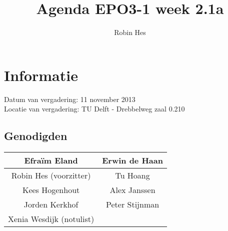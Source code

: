 \documentclass{article}
\begin{document}
\title{Agenda EPO3-1 week 2.1a}%
\author{Robin Hes}%
\maketitle

\section*{Informatie}
Datum van vergadering: 11 november 2013\\ %
Locatie van vergadering: TU Delft - Drebbelweg zaal 0.210 %
\subsection*{Genodigden}
\begin{center}
\begin{tabular}{|c |c |}
	\hline
	Efraïm Eland & Erwin de Haan \\
	\hline
	Robin Hes (voorzitter) & Tu Hoang \\
	\hline
	Kees Hogenhout & Alex Janssen \\
	\hline
	Jorden Kerkhof & Peter Stijnman \\
	\hline
	Xenia Wesdijk (notulist) & \\
	\hline
\end{tabular}
\end{center}
\end{document}

